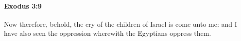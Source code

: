 
		\paragraph{Exodus 3:9} %
			\label{EXODUS-3-9}

			Now therefore, behold, the cry of the children of Israel is come unto me: and I have also seen the oppression wherewith the Egyptians oppress them.


